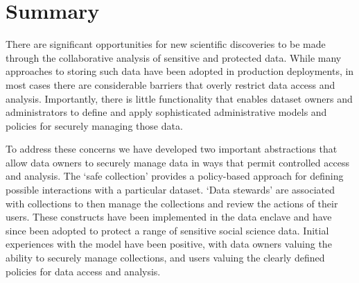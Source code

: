 \section{Summary}


There are significant opportunities for new scientific discoveries to be made
through the collaborative analysis of sensitive and protected
data. While many approaches to storing such data
have been adopted in production deployments, in most cases there are
considerable barriers that overly restrict data access and analysis. 
Importantly, there is little functionality that enables dataset owners and administrators
to define and apply sophisticated administrative models and policies 
for securely managing those data. 

To address these concerns we have developed two important abstractions
that allow data owners to securely manage data in ways that permit
controlled access and analysis. The `safe collection' provides a 
policy-based approach for defining possible interactions with a particular
dataset. `Data stewards' are associated with collections to then
manage the collections and review the actions of their users. These
constructs have been implemented in the \NAME data enclave
and have since been adopted to protect a range of sensitive
social science data. Initial experiences with the model
have been positive, with data owners valuing the ability 
to securely manage collections, and users valuing the clearly
defined policies for data access and analysis. 
